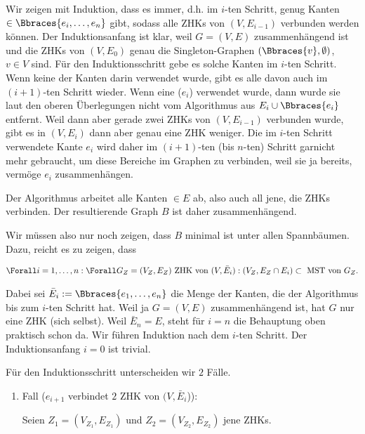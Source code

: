 \begin{solution}
\begin{enumerate}[label = (\Alph*)]
    Wir zeigen mit Induktion, dass es immer, d.h. im $i$-ten Schritt, genug Kanten $\in \Bbraces{e_i, \dots, e_n}$ gibt, sodass alle ZHKs von $(V, E_{i-1})$ verbunden werden können.
    Der Induktionsanfang ist klar, weil $G = (V, E)$ zusammenhängend ist und die ZHKs von $(V, E_0)$ genau die Singleton-Graphen $(\Bbraces{v}, \emptyset)$, $v \in V$ sind.
    Für den Induktionsschritt gebe es solche Kanten im $i$-ten Schritt.
    Wenn keine der Kanten darin verwendet wurde, gibt es alle davon auch im $(i+1)$-ten Schritt wieder.
    Wenn eine ($e_i$) verwendet wurde, dann wurde sie laut den oberen Überlegungen nicht vom Algorithmus aus $E_i \cup \Bbraces{e_i}$ entfernt.
    Weil dann aber gerade zwei ZHKs von $(V, E_{i-1})$ verbunden wurde, gibt es in $(V, E_i)$ dann aber genau eine ZHK weniger.
    Die im $i$-ten Schritt verwendete Kante $e_i$ wird daher im $(i+1)$-ten (bis $n$-ten) Schritt garnicht mehr gebraucht, um diese Bereiche im Graphen zu verbinden, weil sie ja bereits, vermöge $e_i$ zusammenhängen.

    Der Algorithmus arbeitet alle Kanten $\in E$ ab, also auch all jene, die ZHKs verbinden.
    Der resultierende Graph $B$ ist daher zusammenhängend.

    Wir müssen also nur noch zeigen, dass $B$ minimal ist unter allen Spannbäumen.
    Dazu, reicht es zu zeigen, dass

    \begin{align*}
        \Forall i = 1, \dots, n:
        \Forall G_Z = (V_Z, E_Z) ~\text{ZHK von}~ (V, \bar E_i):
        (V_Z, E_Z \cap E_i) \subset ~\text{MST von}~ G_Z.
    \end{align*}

    Dabei sei $\bar E_i := \Bbraces{e_1, \dots, e_n}$ die Menge der Kanten, die der Algorithmus bis zum $i$-ten Schritt  hat.
    Weil ja $G = (V, E)$ zusammenhängend ist, hat $G$ nur eine ZHK (sich selbst).
    Weil $\bar E_n = E$, steht für $i = n$ die Behauptung oben praktisch schon da.
    Wir führen Induktion nach dem $i$-ten Schritt.
    Der Induktionsanfang $i = 0$ ist trivial.

    Für den Induktionsschritt unterscheiden wir $2$ Fälle.

    \begin{enumerate}[label = \arabic*.]

        \item Fall ($e_{i+1}$ verbindet $2$ ZHK von $(V, \bar E_i$)):
        
        Seien $Z_1 = (V_{Z_1}, E_{Z_1})$ und $Z_2 = (V_{Z_2}, E_{Z_2})$ jene ZHKs.


\end{enumerate}
\end{enumerate}
\end{solution}
